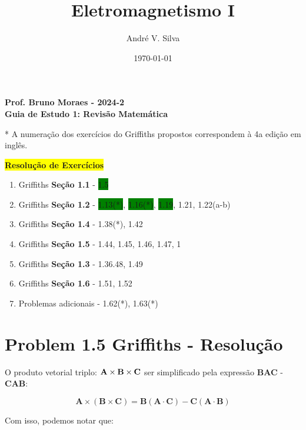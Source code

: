 \documentclass[a4paper,12pt]{article}
\title{ \textbf{\large Eletromagnetismo I }}
\author{Andr\'e V. Silva}
\date{\today}
\begin{document}
\maketitle

\begin{center}
    \textbf{Prof. Bruno Moraes - 2024-2}\\
    \textbf{Guia de Estudo 1: Revisão Matemática}
    \end{center}
    
    * A numeração dos exercícios do Griffiths propostos correspondem à 4a edição em inglês.\\
    
    \begin{center}
    \colorbox{yellow}{\textbf{Resolu\c{c}\~ao de Exerc\'icios}}
    \end{center}
    
    \begin{enumerate}
    \item Griffiths \textbf{Seção 1.1} - \colorbox{green}{1.5} 
    \item Griffiths \textbf{Seção 1.2} - \colorbox{green}{1.13(*)}, \colorbox{green}{1.16(*)}, \colorbox{green}{1.19}, 1.21, 1.22(a-b)
    \item Griffiths \textbf{Seção 1.4} - 1.38(*), 1.42
    \item Griffiths \textbf{Seção 1.5} - 1.44, 1.45, 1.46, 1.47, 1
    \item Griffiths \textbf{Seção 1.3} - 1.36.48, 1.49
    \item Griffiths \textbf{Seção 1.6} - 1.51, 1.52
    \item Problemas adicionais - 1.62(*), 1.63(*)
    \end{enumerate}

\section*{Problem 1.5 Griffiths - Resolu\c{c}\~ao}

O produto vetorial triplo: $\textrm{\textbf{A}}\times\textrm{\textbf{B}}\times\textrm{\textbf{C}}$
ser simplificado pela express\~ao \textbf{BAC} - \textbf{CAB}:

\begin{equation}
    \textbf{A}\times(\textbf{B}\times\textbf{C}) =  \textbf{B}(\textbf{A}\cdot\textbf{C}) - \textbf{C}(\textbf{A}\cdot\textbf{B})
\end{equation}

Com isso, podemos notar que:
\end{document}
